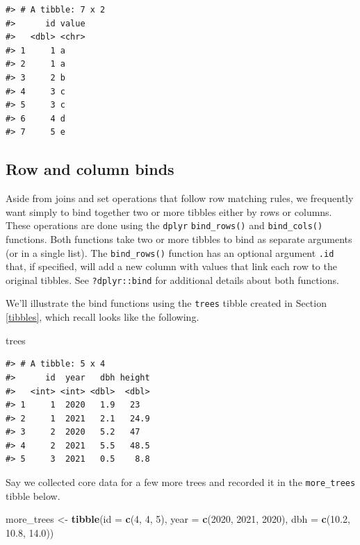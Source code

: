 \documentclass[
  11pt,
]{krantz}
\newenvironment{Shaded}{\begin{snugshade}}{\end{snugshade}}
\newcommand{\DataTypeTok}[1]{\textcolor[rgb]{0.13,0.29,0.53}{#1}}
\newcommand{\DecValTok}[1]{\textcolor[rgb]{0.00,0.00,0.81}{#1}}
\newcommand{\FloatTok}[1]{\textcolor[rgb]{0.00,0.00,0.81}{#1}}
\newcommand{\KeywordTok}[1]{\textcolor[rgb]{0.13,0.29,0.53}{\textbf{#1}}}
\newcommand{\NormalTok}[1]{#1}
\newcommand{\StringTok}[1]{\textcolor[rgb]{0.31,0.60,0.02}{#1}}
\theoremstyle{definition}
\theoremstyle{definition}
\theoremstyle{definition}
\theoremstyle{definition}
\theoremstyle{remark}
\begin{document}
\begin{verbatim}
#> # A tibble: 7 x 2
#>      id value
#>   <dbl> <chr>
#> 1     1 a    
#> 2     1 a    
#> 3     2 b    
#> 4     3 c    
#> 5     3 c    
#> 6     4 d    
#> 7     5 e
\end{verbatim}

\hypertarget{binds}{%
\subsection{Row and column binds}\label{binds}}

Aside from joins and set operations that follow row matching rules, we frequently want simply to bind together two or more tibbles either by rows or columns. These operations are done using the \texttt{dplyr} \texttt{bind\_rows()} and \texttt{bind\_cols()} functions. Both functions take two or more tibbles to bind as separate arguments (or in a single list). The \texttt{bind\_rows()} function has an optional argument \texttt{.id} that, if specified, will add a new column with values that link each row to the original tibbles. See \texttt{?dplyr::bind} for additional details about both functions.

We'll illustrate the bind functions using the \texttt{trees} tibble created in Section \ref{tibbles}, which recall looks like the following.

\begin{Shaded}
\begin{Highlighting}[]
\NormalTok{trees}
\end{Highlighting}
\end{Shaded}

\begin{verbatim}
#> # A tibble: 5 x 4
#>      id  year   dbh height
#>   <int> <int> <dbl>  <dbl>
#> 1     1  2020   1.9   23  
#> 2     1  2021   2.1   24.9
#> 3     2  2020   5.2   47  
#> 4     2  2021   5.5   48.5
#> 5     3  2021   0.5    8.8
\end{verbatim}

Say we collected core data for a few more trees and recorded it in the \texttt{more\_trees} tibble below.

\begin{Shaded}
\begin{Highlighting}[]
\NormalTok{more\_trees \textless{}{-}}\StringTok{ }\KeywordTok{tibble}\NormalTok{(}\DataTypeTok{id =} \KeywordTok{c}\NormalTok{(}\DecValTok{4}\NormalTok{, }\DecValTok{4}\NormalTok{, }\DecValTok{5}\NormalTok{),}
                     \DataTypeTok{year =} \KeywordTok{c}\NormalTok{(}\DecValTok{2020}\NormalTok{, }\DecValTok{2021}\NormalTok{, }\DecValTok{2020}\NormalTok{),}
                     \DataTypeTok{dbh =} \KeywordTok{c}\NormalTok{(}\FloatTok{10.2}\NormalTok{, }\FloatTok{10.8}\NormalTok{, }\FloatTok{14.0}\NormalTok{))}
\end{Highlighting}
\end{Shaded}
\end{document}
